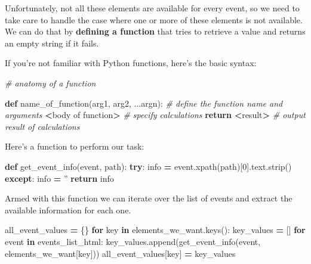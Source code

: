 \documentclass[
]{book}
\newenvironment{Shaded}{\begin{snugshade}}{\end{snugshade}}
\newcommand{\CommentTok}[1]{\textcolor[rgb]{0.56,0.35,0.01}{\textit{#1}}}
\newcommand{\ControlFlowTok}[1]{\textcolor[rgb]{0.13,0.29,0.53}{\textbf{#1}}}
\newcommand{\DecValTok}[1]{\textcolor[rgb]{0.00,0.00,0.81}{#1}}
\newcommand{\KeywordTok}[1]{\textcolor[rgb]{0.13,0.29,0.53}{\textbf{#1}}}
\newcommand{\NormalTok}[1]{#1}
\newcommand{\OperatorTok}[1]{\textcolor[rgb]{0.81,0.36,0.00}{\textbf{#1}}}
\newcommand{\StringTok}[1]{\textcolor[rgb]{0.31,0.60,0.02}{#1}}
\begin{document}
Unfortunately, not all these elements are available for every event, so
we need to take care to handle the case where one or more of these
elements is not available. We can do that by \textbf{defining a function} that
tries to retrieve a value and returns an empty string if it fails.

If you're not familiar with Python functions, here's the basic syntax:

\begin{Shaded}
\begin{Highlighting}[]
\CommentTok{# anatomy of a function}

\KeywordTok{def}\NormalTok{ name_of_function(arg1, arg2, ...argn):  }\CommentTok{# define the function name and arguments}
    \OperatorTok{<}\NormalTok{body of function}\OperatorTok{>}   \CommentTok{# specify calculations}
    \ControlFlowTok{return} \OperatorTok{<}\NormalTok{result}\OperatorTok{>}      \CommentTok{# output result of calculations}
\end{Highlighting}
\end{Shaded}

Here's a function to perform our task:

\begin{Shaded}
\begin{Highlighting}[]
\KeywordTok{def}\NormalTok{ get_event_info(event, path):}
    \ControlFlowTok{try}\NormalTok{:}
\NormalTok{        info }\OperatorTok{=}\NormalTok{ event.xpath(path)[}\DecValTok{0}\NormalTok{].text.strip()}
    \ControlFlowTok{except}\NormalTok{:}
\NormalTok{        info }\OperatorTok{=} \StringTok{''}
    \ControlFlowTok{return}\NormalTok{ info}
\end{Highlighting}
\end{Shaded}

Armed with this function we can iterate over the list of events and
extract the available information for each one.

\begin{Shaded}
\begin{Highlighting}[]
\NormalTok{all_event_values }\OperatorTok{=}\NormalTok{ \{\}}
\ControlFlowTok{for}\NormalTok{ key }\KeywordTok{in}\NormalTok{ elements_we_want.keys():}
\NormalTok{    key_values }\OperatorTok{=}\NormalTok{ []}
    \ControlFlowTok{for}\NormalTok{ event }\KeywordTok{in}\NormalTok{ events_list_html: }
\NormalTok{        key_values.append(get_event_info(event, elements_we_want[key]))}
\NormalTok{    all_event_values[key] }\OperatorTok{=}\NormalTok{ key_values}
\end{Highlighting}
\end{Shaded}
\end{document}
